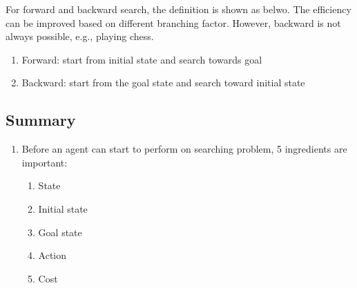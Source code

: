 \noindent
For forward and backward search, the definition is shown as belwo. The efficiency can be improved based on different branching factor. However, backward is not always possible, e.g., playing chess.
\begin{enumerate}
    \item Forward: start from initial state and search towards goal
    \item Backward: start from the goal state and search toward initial state
\end{enumerate}

\subsection{Summary}
\begin{enumerate}
    \item Before an agent can start to perform on searching problem, 5 ingredients are important:
    \begin{enumerate}
        \item State
        \item Initial state
        \item Goal state
        \item Action
        \item Cost
    \end{enumerate}
\end{enumerate}

\pagebreak